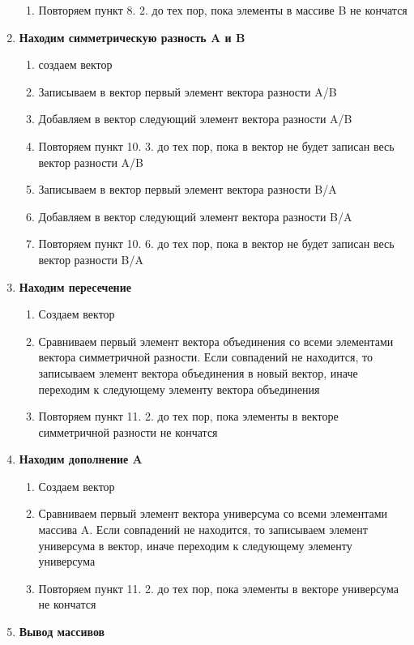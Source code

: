 \documentclass[]{article}
\begin{document}
\begin{enumerate}[1.]
\begin{enumerate}[{9}. 1.]
			\item Повторяем пункт 8. 2. до тех пор, пока элементы в массиве B не кончатся
		\end{enumerate}
		\item \textbf{Находим симметрическую разность A и B}
		\begin{enumerate}[{10}. 1.]
			\item создаем вектор
			\item Записываем в вектор первый элемент вектора разности A/B
			\item Добавляем в вектор следующий элемент вектора разности A/B
			\item Повторяем пункт 10. 3. до тех пор, пока в вектор не будет записан весь вектор разности A/B
			\item Записываем в вектор первый элемент вектора разности B/A
			\item Добавляем в вектор следующий элемент вектора разности B/A
			\item Повторяем пункт 10. 6. до тех пор, пока в вектор не будет записан весь вектор разности B/A
		\end{enumerate}
		\item \textbf{Находим пересечение}
		\begin{enumerate}[{11}. 1.]
			\item Создаем вектор
			\item Сравниваем первый элемент вектора объединения со всеми элементами вектора симметричной разности. Если совпадений не находится, то записываем элемент вектора объединения в новый вектор, иначе переходим к следующему элементу вектора объединения
			\item Повторяем пункт 11. 2. до тех пор, пока элементы в векторе симметричной разности не кончатся
		\end{enumerate}
		\item \textbf{Находим дополнение A}
		\begin{enumerate}[{11}. 1.]
			\item Создаем вектор
			\item Сравниваем первый элемент вектора универсума со всеми элементами массива A. Если совпадений не находится, то записываем элемент универсума в вектор, иначе переходим к следующему элементу универсума
			\item Повторяем пункт 11. 2. до тех пор, пока элементы в векторе универсума не кончатся
		\end{enumerate}
		\item \textbf{Вывод массивов}
		\begin{enumerate}[{12.} 1.]

\end{enumerate}
\end{enumerate}
\end{document}
